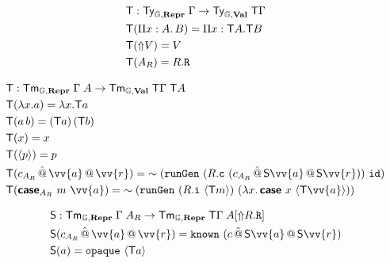 \begin{align*}
   & {\textsf{T}}            : {\textsf{Ty}}_{{\mathbb{G}}, \textbf{Repr}} \; {\Gamma} \to {\textsf{Ty}}_{{\mathbb{G}}, \textbf{Val}}\; {\textsf{T}} \Gamma \\
   & {\textsf{T}}(\Pi x : A .\, B)  = \Pi x : {\textsf{T}} A . {\textsf{T}} B                                \\
   & {\textsf{T}}(\text{$\Uparrow$}{V}) = V                                                                   \\
   & {\textsf{T}}(A_R) = R.\texttt{R}
\end{align*}

\begin{align*}
   & \fun T            : \Tm_{\catG, \mR} \; {\Gamma} \; A \to \Tm_{\catG, \mV}\; {\fun T \Gamma} \; \fun T A                                                                 \\
   & \fun T(\lambda x . a)  = \lambda x . \fun T a                                                                                                                            \\
   & \fun T(a \, b)  = (\fun T a) \, (\fun T b)                                                                                                                               \\
   & \fun T(x) = x                                                                                                                                                            \\
   & \fun T(\quot {p}) = p                                                                                                                                                    \\
   & \fun T(c_{A_R} \, \hat{@} \, \vv{a} \,@\, \vv{r}) =  \splice{(\defin{runGen} \ (R.\defin{c} \ (c_{A_R} \, \hat{@} \, \fun S \vv{a} \,@\, \fun S \vv{r})) \  \defin{id})} \\
   & \fun T(\inte{case}_{A_R}\ m\ \vv{a}) = \splice{(\defin{runGen} \ (R.\defin{i} \ \quot{\fun T m}) \  (\lambda x.\, \inte{case}\ x \ \quot{\fun T\vv{a}}))}                \\
\end{align*}

\begin{align*}
   & \fun S            : \Tm_{\catG, \mR} \; {\Gamma} \; A_R \to \Tm_{\catG,\mR}\; {\fun T \Gamma} \; A[\lift{R.\defin{R}}] \\
   & \fun S(c_{A_R} \, \hat{@} \, \vv{a} \,@\, \vv{r}) = \defin{known}\ (c \, \hat{@} \, \fun S\vv{a} \,@\, \fun S\vv{r})   \\
   & \fun S(a)  = \defin{opaque}\ \quot{\fun T a}
\end{align*}

